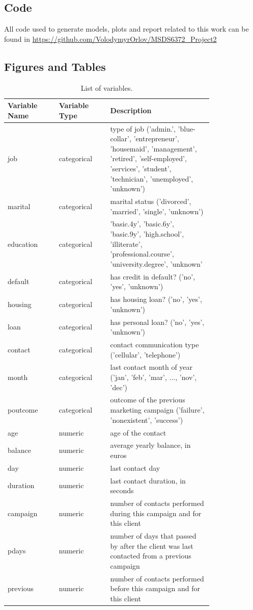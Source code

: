 \documentclass[]{article}
\begin{document}
\subsection{Code}\label{code}

All code used to generate models, plots and report related to this work
can be found in
\url{https://github.com/VolodymyrOrlov/MSDS6372_Project2}

\subsection{Figures and Tables}\label{figures-and-tables}

\begin{table}
\centering
 \begin{tabular}{|p{0.2\linewidth}|p{0.2\linewidth}|p{0.4\linewidth}|}
 \hline
 Variable Name & Variable Type & Description  \\ \hline
 job  &  categorical  & type of job ('admin.', 'blue-collar', 'entrepreneur', 'housemaid', 'management', 'retired', 'self-employed', 'services', 'student', 'technician', 'unemployed', 'unknown') \\ 
 marital  & categorical  & marital status ('divorced', 'married', 'single', 'unknown')  \\ 
 education  & categorical  & 'basic.4y', 'basic.6y', 'basic.9y', 'high.school', 'illiterate', 'professional.course', 'university.degree', 'unknown'  \\ 
 default  & categorical  & has credit in default? ('no', 'yes', 'unknown')  \\ 
 housing  & categorical  & has housing loan? ('no', 'yes', 'unknown')  \\ 
 loan  & categorical  & has personal loan? ('no', 'yes', 'unknown')  \\ 
 contact  & categorical  & contact communication type ('cellular', 'telephone')  \\ 
 month  & categorical  & last contact month of year ('jan', 'feb', 'mar', ..., 'nov', 'dec')  \\ 
 poutcome  & categorical  & outcome of the previous marketing campaign ('failure', 'nonexistent', 'success')  \\ 
 age  & numeric  & age of the contact   \\ 
 balance  & numeric  & average yearly balance, in euros  \\ 
 day  & numeric  & last contact day  \\ 
 duration  & numeric  & last contact duration, in seconds  \\ 
 campaign  & numeric  & number of contacts performed during this campaign and for this client  \\ 
 pdays  & numeric  & number of days that passed by after the client was last contacted from a previous campaign  \\ 
 previous  & numeric  & number of contacts performed before this campaign and for this client  \\
 \hline
 \end{tabular}
 \caption{List of variables.}
 \label{table1}
\end{table}
\end{document}
